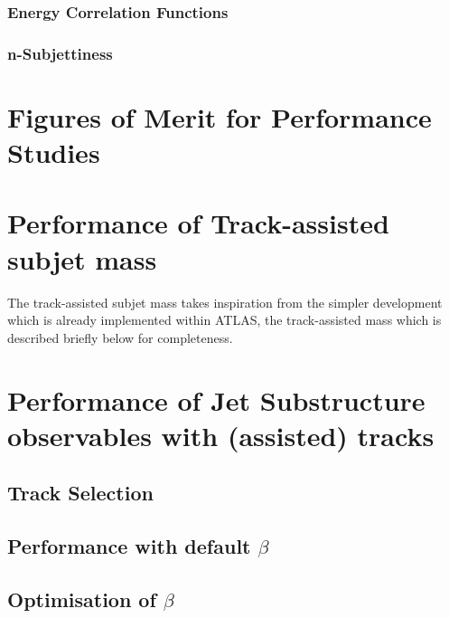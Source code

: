 \documentclass[UKenglish,texlive=2013]{\ATLASLATEXPATH atlasdoc}
\begin{document}
\subsubsection{Energy Correlation Functions}\label{subsec:ECF}


\subsubsection{n-Subjettiness}\label{subsec:nSub}


\section{Figures of Merit for Performance Studies}\label{sec:FoM}


\clearpage
\section{Performance of Track-assisted subjet mass}
\label{sec:mtas}
The track-assisted subjet mass takes inspiration from the simpler development which is already implemented within ATLAS, the track-assisted mass which is described briefly below for completeness.


\clearpage
\section{Performance of Jet Substructure observables with (assisted) tracks}\label{subsec:ta_adapt}


\subsection{Track Selection}


\subsection{Performance with default $\beta$}


\subsection{Optimisation of $\beta$}

\end{document}
